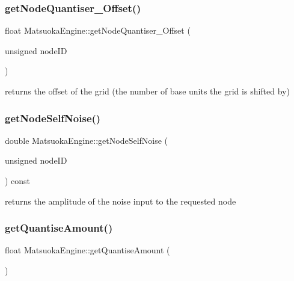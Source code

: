 \subsubsection{\texorpdfstring{get\+Node\+Quantiser\+\_\+\+Offset()}{getNodeQuantiser\_Offset()}}
{\footnotesize\ttfamily float Matsuoka\+Engine\+::get\+Node\+Quantiser\+\_\+\+Offset (\begin{DoxyParamCaption}\item[{unsigned}]{node\+ID }\end{DoxyParamCaption})}



returns the offset of the grid (the number of base units the grid is shifted by) 

\mbox{\label{classMatsuokaEngine_a6857e20e39f058a4145fdc4493df6583}} 
\subsubsection{\texorpdfstring{get\+Node\+Self\+Noise()}{getNodeSelfNoise()}}
{\footnotesize\ttfamily double Matsuoka\+Engine\+::get\+Node\+Self\+Noise (\begin{DoxyParamCaption}\item[{unsigned}]{node\+ID }\end{DoxyParamCaption}) const}



returns the amplitude of the noise input to the requested node 

\mbox{\label{classMatsuokaEngine_aaf73c32f2c81d4895e98e1a8fe31cea1}} 
\subsubsection{\texorpdfstring{get\+Quantise\+Amount()}{getQuantiseAmount()}\hspace{0.1cm}{\footnotesize\ttfamily [1/2]}}
{\footnotesize\ttfamily float Matsuoka\+Engine\+::get\+Quantise\+Amount (\begin{DoxyParamCaption}{ }\end{DoxyParamCaption})}



